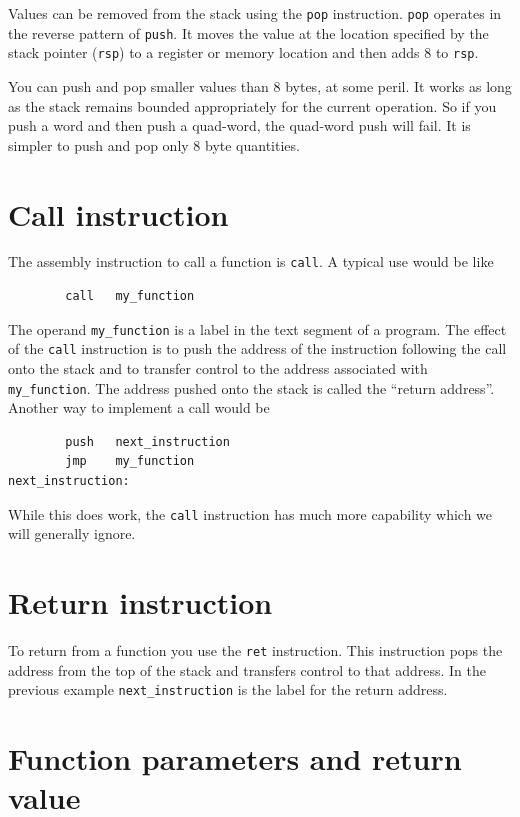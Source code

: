 \documentclass[11pt,b5paper]{book}
\begin{document}
Values can be removed from the stack using the {\tt pop} instruction.
{\tt pop} operates in the reverse pattern of {\tt push}.
It moves the value at the location specified by the stack pointer ({\tt rsp}) to a register or memory
location and then adds 8 to {\tt rsp}.

You can push and pop smaller values than 8 bytes, at some peril.
It works as long as the stack remains bounded appropriately for the current operation.
So if you push a word and then push a quad-word, the quad-word push will fail.
It is simpler to push and pop only 8 byte quantities.

\section{Call instruction}

The assembly instruction to call a function is {\tt call}. 
A typical use would be like
\begin{verbatim}
        call   my_function
\end{verbatim}

The operand {\tt my\_function} is a label in the text segment of a program.
The effect of the {\tt call} instruction is to push the address of the instruction
following the call onto the stack and to transfer control to the address associated with
{\tt my\_function}.
The address pushed onto the stack is called the ``return address''. 
Another way to implement a call would be
\begin{verbatim}
        push   next_instruction
        jmp    my_function
next_instruction:
\end{verbatim}
While this does work, the {\tt call} instruction has much more capability which we will generally
ignore.

\section{Return instruction}

To return from a function you use the {\tt ret} instruction. 
This instruction pops the address from the top of the stack and transfers control
to that address.
In the previous example {\tt next\_instruction} is the label for the return address.

\section{Function parameters and return value}
\end{document}
